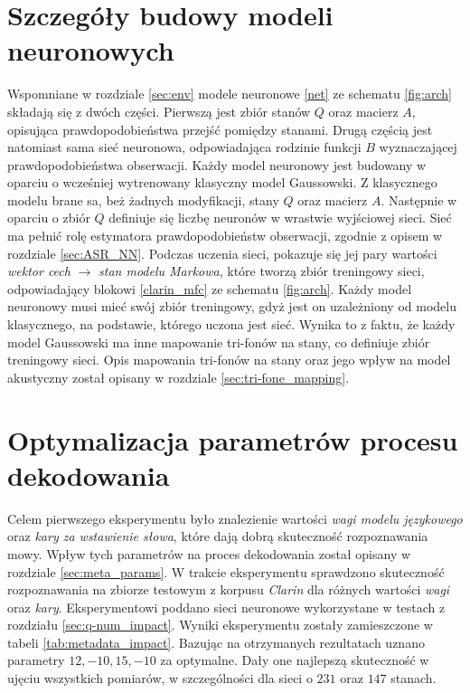 \documentclass[shortabstract, mgr]{iithesis}
\newcommand{\refBlock}[1]{
	\hyperref[#1]{\ref*{#1}}
}
\begin{document}
	\section{ Szczegóły budowy modeli neuronowych}
		\label{sec:nn_model_details}
		Wspomniane w rozdziale \ref{sec:env} modele neuronowe \refBlock{net} ze schematu \ref{fig:arch} składają się z dwóch części. Pierwszą jest zbiór stanów $Q$ oraz macierz $A$, opisująca prawdopodobieństwa przejść pomiędzy stanami. Drugą częścią jest natomiast sama sieć neuronowa, odpowiadająca rodzinie funkcji $B$ wyznaczającej prawdopodobieństwa obserwacji. Każdy model neuronowy jest budowany w oparciu o wcześniej wytrenowany klasyczny model Gaussowski. Z klasycznego modelu brane sa, beż żadnych modyfikacji, stany $Q$ oraz macierz $A$. Następnie w oparciu o zbiór $Q$ definiuje się liczbę neuronów w wrastwie wyjściowej sieci. Sieć ma pełnić rolę estymatora prawdopodobieństw obserwacji, zgodnie z opisem w rozdziale \ref{sec:ASR_NN}. Podczas uczenia sieci, pokazuje się jej pary wartości \textit{wektor cech} $\longrightarrow$ \textit{stan modelu Markowa}, które tworzą zbiór treningowy sieci, odpowiadający blokowi \refBlock{clarin_mfc} ze schematu \ref{fig:arch}. Każdy model neuronowy musi mieć swój zbiór treningowy, gdyż jest on uzależniony od modelu klasycznego, na podstawie, którego uczona jest sieć. Wynika to z faktu, że każdy model Gaussowski ma inne mapowanie tri-fonów na stany, co definiuje zbiór treningowy sieci. Opis mapowania tri-fonów na stany oraz jego wpływ na model akustyczny został opisany w rozdziale \ref{sec:tri-fone_mapping}.
	
	\section{ Optymalizacja parametrów procesu dekodowania }
		\label{sec:metadata_impact}
		Celem pierwszego eksperymentu było znalezienie wartości \textit{wagi modelu językowego} oraz \textit{kary za wstawienie słowa}, które dają dobrą skuteczność rozpoznawania mowy. Wpływ tych parametrów na proces dekodowania został opisany w rozdziale \ref{sec:meta_params}. W trakcie eksperymentu sprawdzono skuteczność rozpoznawania na zbiorze testowym z korpusu \textit{Clarin} dla różnych wartości \textit{wagi} oraz \textit{kary}. Eksperymentowi poddano sieci neuronowe wykorzystane w testach z rozdziału \ref{sec:q-num_impact}. Wyniki eksperymentu zostały zamieszczone w tabeli \ref{tab:metadata_impact}. Bazując na otrzymanych rezultatach uznano parametry $12, -10, 15, -10$ za optymalne. Dały one najlepszą skuteczność w ujęciu wszystkich pomiarów, w szczególności dla sieci o $231$ oraz $147$ stanach.
		
\end{document}

